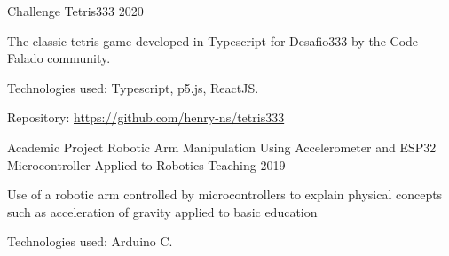 \begin{cventries}
  \cventry
  {Challenge} %
  {Tetris333} %
  {} %
  {2020} %
  {
    \begin{cvitems} %
      \item {The classic tetris game developed in Typescript for Desafio333 by the Code Falado community.}
      \item {Technologies used: Typescript,  p5.js, ReactJS.}
      \item {Repository: \url{https://github.com/henry-ns/tetris333}}
    \end{cvitems}
  }

  \cventry
  {Academic Project} %
  {Robotic Arm Manipulation Using Accelerometer and ESP32 Microcontroller Applied to Robotics Teaching} %
  {} %
  {2019} %
  {
    \begin{cvitems} %
      \item {Use of a robotic arm controlled by microcontrollers to explain physical concepts such as acceleration of gravity applied to basic education}
      \item {Technologies used: Arduino C.}
    \end{cvitems}
  }


\end{cventries}